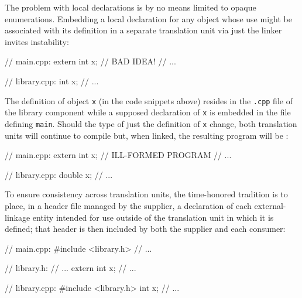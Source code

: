 The problem with local declarations is by no means limited to opaque
enumerations. Embedding a local declaration for any object whose use
might be associated with its definition in a separate translation unit
via just the linker invites instability:

\noindent\begin{minipage}{.45\textwidth}
\begin{emcppslisting}
// main.cpp:
extern int x;  // BAD IDEA!
// ...
\end{emcppslisting}
\end{minipage}\hfill
\begin{minipage}{.45\textwidth}
\begin{emcppslisting}
// library.cpp:
int x;
// ...
\end{emcppslisting}
\end{minipage}

\noindent The definition of object \lstinline!x! (in the code snippets above) resides
in the \lstinline!.cpp! file of the library component while a supposed
declaration of \lstinline!x! is embedded in the file defining
\lstinline!main!. Should the type of just the definition of \lstinline!x!
change, both translation units will continue to compile but, when
linked, the resulting program will be :

\noindent\begin{minipage}{.65\textwidth}
\begin{emcppslisting}
// main.cpp:
extern int x;  // ILL-FORMED PROGRAM
// ...
\end{emcppslisting}
\end{minipage}\hfill
\begin{minipage}{.35\textwidth}
\begin{emcppslisting}
// library.cpp:
double x;
// ...
\end{emcppslisting}
\end{minipage}

\noindent To ensure consistency across translation units, the time-honored
tradition is to place, in a header file managed by the supplier, a
declaration of each external-linkage entity intended for use outside of
the translation unit in which it is defined; that header is then
included by both the supplier and each consumer:

\noindent\begin{minipage}{.3\textwidth}
\begin{emcppslisting}[emcppsbatch=e10]
// main.cpp:
#include <library.h>
// ...
\end{emcppslisting}
\end{minipage}\hfill
\begin{minipage}{.3\textwidth}
\begin{emcppslisting}[emcppsbatch=e10]
// library.h:
// ...
extern int x;
// ...
\end{emcppslisting}
\end{minipage}
\begin{minipage}{.3\textwidth}
\begin{emcppslisting}[emcppsbatch=e10]
// library.cpp:
#include <library.h>
int x;
// ...
\end{emcppslisting}
\end{minipage}

